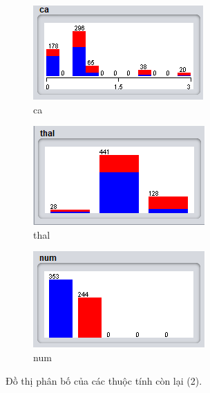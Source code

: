 \begin{figure}[H]
    \centering %
   \begin{subfigure}{0.38\textwidth}
  \includegraphics[width=\linewidth]{2/14.png}
  \caption{ca}
  \label{fig:1}
\end{subfigure}\hfil %
\begin{subfigure}{0.38\textwidth}
  \includegraphics[width=\linewidth]{2/15.png}
  \caption{thal}
  \label{fig:3}
\end{subfigure}

\medskip
\begin{subfigure}{0.38\textwidth}
  \includegraphics[width=\linewidth]{2/16.png}
  \caption{num}
  \label{fig:1}
\end{subfigure}\hfil %
\caption{Đồ thị phân bố của các thuộc tính còn lại (2).}
\label{fig:images}
\end{figure}


